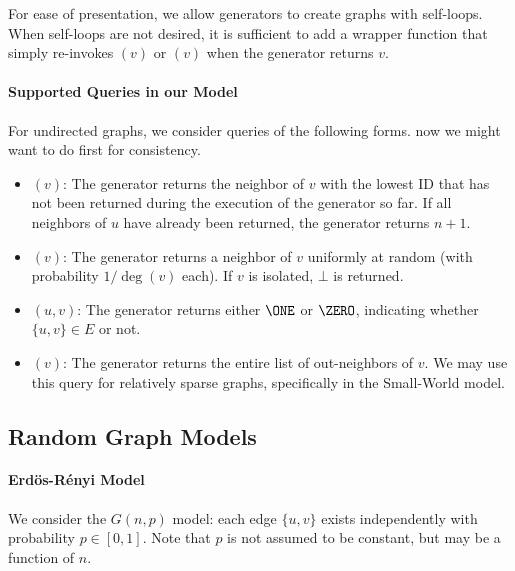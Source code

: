 For ease of presentation, we allow generators to create graphs with self-loops.
When self-loops are not desired, it is sufficient to add a wrapper function that simply re-invokes $(v)$ or $(v)$ when the generator returns $v$.


\paragraph{Supported Queries in our Model} 
For undirected graphs, we consider queries of the following forms.
now we might want to do  first for consistency.
\begin{itemize}
\item {}$(v)$: The generator returns the neighbor of $v$ with the lowest ID that has not been returned during the execution of the generator so far. If all neighbors of $u$ have already been returned, the generator returns $n+1$.
\item {}$(v)$: The generator returns a neighbor of $v$ uniformly at random (with probability $1/\deg(v)$ each). If $v$ is isolated, $\bot$ is returned.
\item {}$(u,v)$: The generator returns either $\ONE$ or $\ZERO$, indicating whether $\{u,v\}\in E$ or not.
\item {}$(v)$: The generator returns the entire list of out-neighbors of $v$. We may use this query for relatively sparse graphs, specifically in the Small-World model.
\end{itemize}

\subsection{Random Graph Models}
\label{sec:graph_model}

\paragraph{Erd\"{o}s-R\'{e}nyi Model}
We consider the $G(n, p)$ model: each edge $\{u,v\}$ exists independently with probability $p \in [0, 1]$.
Note that $p$ is not assumed to be constant, but may be a function of $n$.

